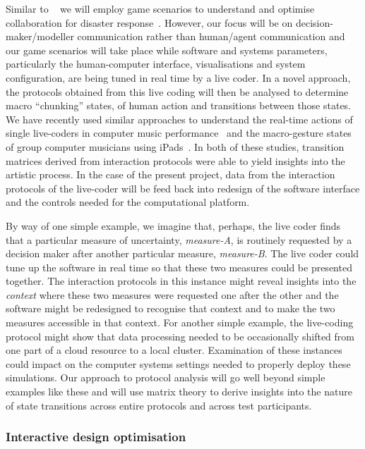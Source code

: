 \documentclass[a4paper,fontsize=12pt]{scrartcl}
\begin{document}
Similar to ~\parencite{ramchurn2016human} we will employ game
scenarios to understand and optimise collaboration for disaster
response~\parencite{ramchurn2016human}. However, our focus will be on
decision-maker/modeller communication rather than human/agent
communication and our game scenarios will take place while software
and systems parameters, particularly the human-computer interface,
visualisations and system configuration, are being tuned in real time
by a live coder. In a novel approach, the protocols obtained from this
live coding will then be analysed to determine macro ``chunking''
states, of human action and transitions between those states. We have
recently used similar approaches to understand the real-time actions
of single live-coders in computer music
performance~\parencite{swift2014coding} and the macro-gesture states
of group computer musicians using
iPads~\parencite{martin2015tracking}. In both of these studies,
transition matrices derived from interaction protocols were able to
yield insights into the artistic process. In the case of the present
project, data from the interaction protocols of the live-coder will be
feed back into redesign of the software interface and the controls
needed for the computational platform.

By way of one simple example, we imagine that, perhaps, the live coder
finds that a particular measure of uncertainty, \emph{measure-A}, is
routinely requested by a decision maker after another particular
measure, \emph{measure-B}. The live coder could tune up the software
in real time so that these two measures could be presented together.
The interaction protocols in this instance might reveal insights into
the \emph{context} where these two measures were requested one after
the other and the software might be redesigned to recognise that
context and to make the two measures accessible in that context. For
another simple example, the live-coding protocol might show that data
processing needed to be occasionally shifted from one part of a cloud
resource to a local cluster. Examination of these instances could
impact on the computer systems settings needed to properly deploy
these simulations. Our approach to protocol analysis will go well
beyond simple examples like these and will use matrix theory to derive
insights into the nature of state transitions across entire protocols
and across test participants.


\subsubsection*{Interactive design optimisation}
\end{document}
